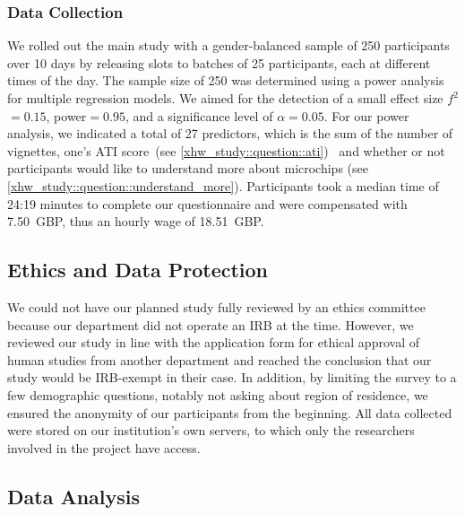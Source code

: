 \subsubsection{Data Collection} 
We rolled out the main study with a gender-balanced sample of 250 participants over 10 days by releasing slots to batches of 25 participants, each at different times of the day.
The sample size of 250 was determined using a power analysis for multiple regression models.
We aimed for the detection of a small effect size $f^2$$=$$0.15$, power$=$$0.95$, and a significance level of $\alpha$$=$$0.05$.
For our power analysis, we indicated a total of 27 predictors, which is the sum of the number of vignettes, one's \ac{ATI} score~(see \autoref{xhw_study::question::ati})~\cite{franke2019personal} and whether or not participants would like to understand more about microchips (see \autoref{xhw_study::question::understand_more}).
Participants took a median time of 24:19 minutes to complete our questionnaire and were compensated with 7.50~GBP, thus an hourly wage of 18.51~GBP.

\subsection{Ethics and Data Protection}
\label{xhw_study::subsec::ethics}
We could not have our planned study fully reviewed by an ethics committee because our department did not operate an \ac{IRB} at the time.
However, we reviewed our study in line with the application form for ethical approval of human studies from another department and reached the conclusion that our study would be \ac{IRB}-exempt in their case.
In addition, by limiting the survey to a few demographic questions, notably not asking about region of residence, we ensured the anonymity of our participants from the beginning. 
All data collected were stored on our institution's own servers, to which only the researchers involved in the project have access.

\subsection{Data Analysis}
\label{xhw_study::subsec::analysis}


